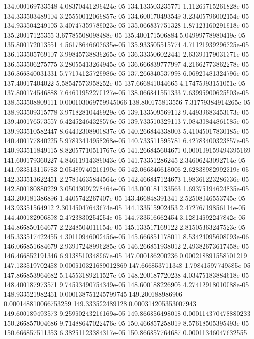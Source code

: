{134.000169733548 4.08370441299424e-05
134.133503235771 1.11266715261828e-05
134.333503489104 3.25550012069857e-05
134.600170493549 3.23405796002154e-05
134.933504249105 3.40747359789023e-05
135.066837751328 1.87123160291918e-05
135.20017125355 3.67785508098488e-05
135.400171506884 5.04999778980419e-05
135.800172013551 4.56178646603635e-05
135.933505515774 4.71121939296325e-05
136.133505769107 3.99845738839265e-05
136.333506022441 2.63390179031371e-05
136.533506275775 3.28055413264945e-05
136.666839777997 4.21662773862278e-05
136.866840031331 5.77194125729986e-05
137.266840537998 6.06920481324796e-05
137.40017404022 5.58547573958252e-05
137.666841044665 4.17475993151051e-05
137.800174546888 7.64601952270127e-05
138.066841551333 7.63995900625503e-05
138.533508809111 0.000103069759945066
138.800175813556 7.31779384914265e-05
138.933509315778 3.97182810449929e-05
139.133509569112 9.44939683453073e-05
139.400176573557 6.42452464328576e-05
139.733510329113 7.08430844861585e-05
139.933510582447 8.64402308900837e-05
140.266844338003 5.41045017830185e-05
140.400177840225 5.97893414958268e-05
140.733511595781 6.42783400323857e-05
140.933511849115 8.82057710511767e-05
141.266845604671 0.000109159494395169
141.600179360227 4.84611914389043e-05
141.73351286245 2.34606243092704e-05
141.933513115783 2.05489740216199e-05
142.066846618006 2.62838982992319e-05
142.333513622451 2.27804635844564e-05
142.466847124673 1.98361223286336e-05
142.800180880229 3.05043097278464e-05
143.000181133563 1.69375194624835e-05
143.200181386896 1.4405742267407e-05
143.466848391341 2.52508046553745e-05
143.93351564912 2.30145047643674e-05
144.133515902453 2.47276719856114e-05
144.400182906898 2.4723830254254e-05
144.733516662454 3.12814692247842e-05
144.866850164677 2.2248504011054e-05
145.133517169122 2.81505363247523e-05
145.333517422455 4.30110946002456e-05
145.666851178011 8.53424095608093e-06
146.066851684679 2.93907248996285e-05
146.266851938012 2.49382673617458e-05
146.466852191346 6.9138510348967e-05
147.000186200236 0.000218891558701219
147.133519702458 0.000610321689012869
147.666853711348 1.79841597749585e-05
147.866853964682 5.14553189211527e-05
148.200187720238 4.03475183884618e-05
148.400187973571 9.74593490754349e-05
148.600188226905 4.27412918010088e-05
148.933521982461 0.000138751245799745
149.200188986906 0.000148810066753259
149.333522489128 0.000314205353007943
149.600189493573 9.25960243216169e-05
149.866856498018 0.000114370478880233
150.266857004686 9.71488647022476e-05
150.466857258019 8.57618505395493e-05
150.666857511353 6.38251123384317e-05
150.866857764687 0.00011346047632555
}
